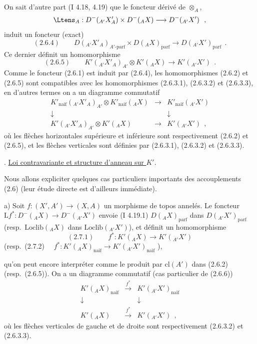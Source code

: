 On sait d'autre part (I 4.18, 4.19) que le foncteur d\'{e}riv\'{e} de $\otimes_A$,
\[
\Ltens_A : D^-({}_{A'} X'_A) \times D^-({}_A X) \longrightarrow D^-({}_{A'} X')\ \ ,
\]
induit un foncteur (exact)
\[
\mathrm{(2.6.4)} \qquad D({}_{A'} X'_A)_{A'\text{-}\mathrm{parf}} \times D({}_A X)_{\mathrm{parf}} \longrightarrow D({}_{A'} X')_{\mathrm{parf}}\ \ .
\]
Ce dernier d\'{e}finit un homomorphisme
\[
\mathrm{(2.6.5)} \qquad K'({}_{A'} X'_A)_{A'} \otimes K'({}_A X) \longrightarrow K'({}_{A'} X')\ \ .
\]
Comme le foncteur (2.6.1) est induit par (2.6.4), les homomorphismes (2.6.2) et (2.6.5) sont compatibles avec les homomorphismes (2.6.3.1), (2.6.3.2) et (2.6.3.3), en d'autres termes on a un diagramme commutatif
\[
\begin{array}{ccc}
K'_{\mathrm{naif}}({}_{A'} X'_A)_{A'} \otimes K'_{\mathrm{naif}}({}_A X) & \longrightarrow & K'_{\mathrm{naif}}({}_{A'} X') \\
\downarrow & & \downarrow \\
K'({}_{A'} X'_A)_{A'} \otimes K'({}_A X) & \longrightarrow & K'({}_{A'} X')\ \ ,
\end{array}
\]
o\`{u} les fl\`{e}ches horizontales sup\'{e}rieure et inf\'{e}rieure sont respectivement (2.6.2) et (2.6.5), et les fl\`{e}ches verticales sont d\'{e}finies par (2.6.3.1), (2.6.3.2) et (2.6.3.3).

\medskip

. \underline{Loi contravariante et structure d'anneau sur $K'$}.

Nous allons expliciter quelques cas particuliers importants des accouplements (2.6) (leur \'{e}tude directe est d'ailleurs imm\'{e}diate).

\smallskip

a) Soit $f : (X', A') \longrightarrow (X, A)$ un morphisme de topos annel\'{e}s. Le foncteur $\mathrm{L}f^* : D^-({}_A X) \longrightarrow D^-({}_{A'} X')$ envoie (I 4.19.1) $D({}_A X)_{\mathrm{parf}}$ dans $D({}_{A'} X')_{\mathrm{parf}}$ (resp.\ $\mathrm{Loclib}({}_A X)$ dans $\mathrm{Loclib}({}_{A'} X')$), et d\'{e}finit un homomorphisme
\[
\mathrm{(2.7.1)} \qquad f^* : K'({}_A X) \longrightarrow K'({}_{A'} X')
\]
(resp.\ (2.7.2) $\quad f^* : K'({}_A X)_{\mathrm{naif}} \longrightarrow K'({}_{A'} X')_{\mathrm{naif}}$ \quad ),

qu'on peut encore interpr\'{e}ter comme le produit par $\mathrm{cl}(A')$ dans (2.6.2) (resp.\ (2.6.5)). On a un diagramme commutatif (cas particulier de (2.6.6))
\[
\begin{array}{ccc}
K'({}_A X)_{\mathrm{naif}} & \xrightarrow{f^*} & K'({}_{A'} X')_{\mathrm{naif}} \\
\downarrow & & \downarrow \\
K'({}_A X) & \xrightarrow{f^*} & K'({}_{A'} X')\ \ ,
\end{array}
\]
o\`{u} les fl\`{e}ches verticales de gauche et de droite sont respectivement (2.6.3.2) et (2.6.3.3).


